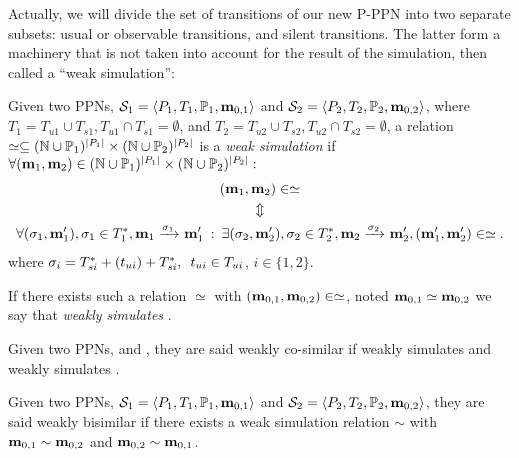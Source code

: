 Actually, we will divide the set of transitions of our new P-\ac{PPN} into two separate subsets: usual or observable transitions, and silent transitions.
The latter form a machinery that is not taken into account for the result of the simulation, then called a ``weak simulation'':
\begin{defi}
  Given two \acp{PPN}, $\defPPN[1]$ and $\defPPN[2]$,
  where $T_1 = T_{u1} \cup T_{s1}, T_{u1} \cap T_{s1} = \emptyset$,
  and   $T_2 = T_{u2} \cup T_{s2}, T_{u2} \cap T_{s2} = \emptyset$,
  a relation $\simeq \subseteq (\mathbb{N} \cup  \mathbb{P}_1)^{\left|P_1\right|} \times (\mathbb{N} \cup  \mathbb{P}_2)^{\left|P_2\right|}$ is a \emph{weak simulation} if $\forall (\mathbf{m}_1, \mathbf{m}_2) \in (\mathbb{N} \cup  \mathbb{P}_1)^{\left|P_1\right|} \times (\mathbb{N} \cup  \mathbb{P}_2)^{\left|P_2\right|} : $
  \begin{gather*}
    (\mar_1, \mar_2) \in \simeq \\
    \Updownarrow\\
    \forall (\seqt_1,\mar'_1), \seqt_1 \in \transitions_1^*, \mar_1 \fire{\seqt_1} \mar'_1 \>:\>
    \exists (\seqt_2,\mar'_2), \seqt_2 \in \transitions_2^*, \mar_2 \fire{\seqt_2} \mar'_2, (\mar'_1, \mar'_2) \in \simeq.
  \end{gather*}
  where $\seqt_i = \transitions_{si}^* + (t_{ui}) + \transitions_{si}^*,\enspace t_{ui} \in \transitions_{ui}$, $i \in \{1, 2\}$.%

  If there exists such a relation $\simeq$ with $(\mathbf{m}_{0,1}, \mathbf{m}_{0,2}) \in \simeq$, noted $\mathbf{m}_{0,1} \simeq \mathbf{m}_{0,2}$ we say that \namePPN[2] \emph{weakly simulates} \namePPN[1].
\end{defi}

\begin{defi}
  Given two \acp{PPN}, \namePPN[1] and \namePPN[2],
  they are said weakly co-similar if \namePPN[1] weakly simulates \namePPN[2] and \namePPN[2] weakly simulates \namePPN[1].
\end{defi}

\begin{defi}
  Given two \acp{PPN}, $\defPPN[1]$ and $\defPPN[2]$,
  they are said weakly bisimilar if there exists a weak simulation relation $\sim$ with $\mathbf{m}_{0,1} \sim \mathbf{m}_{0,2}$ and $\mathbf{m}_{0,2} \sim \mathbf{m}_{0,1}$.
\end{defi}

